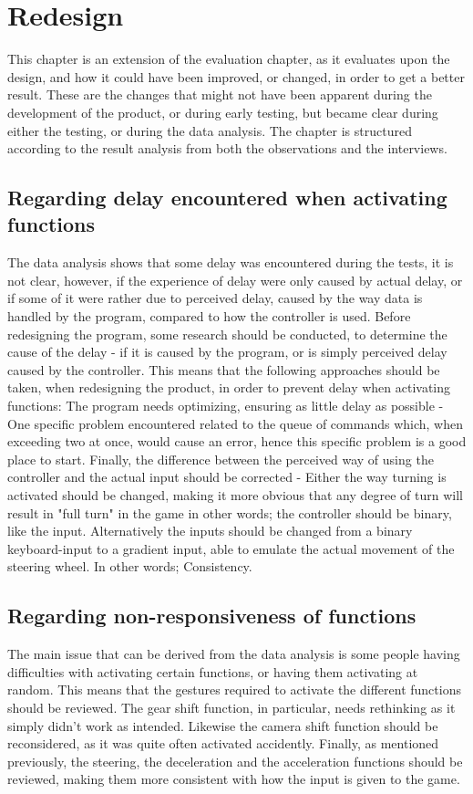 \section{Redesign} \label{sec:redesign}
This chapter is an extension of the evaluation chapter, as it evaluates upon the design, and how it could have been improved, or changed, in order to get a better result. These are the changes that might not have been apparent during the development of the product, or during early testing, but became clear during either the testing, or during the data analysis. The chapter is structured according to the result analysis from both the observations and the interviews.

\subsection{Regarding delay encountered when activating functions}
The data analysis shows that some delay was encountered during the tests, it is not clear, however, if the experience of delay were only caused by actual delay, or if some of it were rather due to perceived delay, caused by the way data is handled by the program, compared to how the controller is used. 
Before redesigning the program, some research should be conducted, to determine the cause of the delay - if it is caused by the program, or is simply perceived delay caused by the controller.
This means that the following approaches should be taken, when redesigning the product, in order to prevent delay when activating functions:
The program needs optimizing, ensuring as little delay as possible - One specific problem encountered related to the queue of commands which, when exceeding two at once, would cause an error, hence this specific problem is a good place to start.
Finally, the difference between the perceived way of using the controller and the actual input should be corrected - Either the way turning is activated should be changed, making it more obvious that any degree of turn will result in "full turn" in the game in other words; the controller should be binary, like the input. Alternatively the inputs should be changed from a binary keyboard-input to a gradient input, able to emulate the actual movement of the steering wheel. In other words; Consistency.

\subsection{Regarding non-responsiveness of functions}
The main issue that can be derived from the data analysis is some people having difficulties with activating certain functions, or having them activating at random. This means that the gestures required to activate the different functions should be reviewed.
The gear shift function, in particular, needs rethinking as it simply didn't work as intended. Likewise the camera shift function should be reconsidered, as it was quite often activated accidently. Finally, as mentioned previously, the steering, the deceleration and the acceleration functions should be reviewed, making them more consistent with how the input is given to the game.

